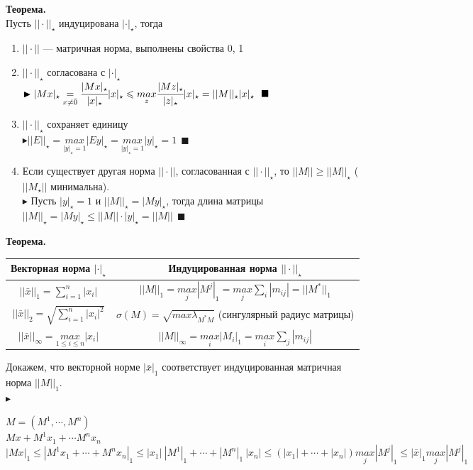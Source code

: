 \documentclass[12pt]{article}
\theoremstyle{definition}
\numberwithin{equation}{section}
\begin{document}
	\textbf{Теорема.}\\
	Пусть $||\cdot ||_{\star}$ индуцирована $|\cdot |_{\star}$, тогда \begin{enumerate}
		\item $||\cdot ||$ --- матричная норма, выполнены свойства 0, 1
		\item $||\cdot ||_{\star}$ согласована с $|\cdot |_{\star}$\\
		$\blacktriangleright |Mx|_{\star}\underset{x\neq \bar 0}{=}\cfrac{|Mx|_{\star}}{|x|_{\star}}|x|_{\star} \leqslant \underset{z}{max}\cfrac{|Mz|_{\star}}{|z|_{\star}}|x|_{\star}=||M||_{\star}|x|_{\star}~~\blacksquare$
		\item $||\cdot ||_{\star}$ сохраняет единицу\\
		$\blacktriangleright ||E||_{\star}=\underset{|y|_{\star}=1}{max}|Ey|_{\star}=\underset{|y|_{\star}=1}{max}|y|_{\star}=1~~\blacksquare$ 
		\item Если существует другая норма $||\cdot ||$, согласованная с $||\cdot||_{\star}$, то $||M|| \geqslant ||M||_{\star}$ ($||M_{\star}||$ минимальна).\\
		$\blacktriangleright$ Пусть $|y|_{\star}=1$ и $||M||_{\star}=|My|_{\star}$, тогда длина матрицы $||M||_{\star}=|My|_{\star} \leqslant ||M||\cdot |y|_{\star}=||M||~~\blacksquare$
	\end{enumerate}
	\textbf{Теорема.}
	\begin{center}
		\begin{tabular}{ | c || c |}
			\hline
			Векторная норма $|\cdot|_{\star}$ & Индуцированная норма $||\cdot||_{\star}$\\ \hline \hline
			$||\bar x||_1 = \sum\limits_{i=1}^n |x_i|$ & $||M||_1 = \underset{j}{max}|M^j|_1=\underset{j}{max}\sum\limits_i|m_{ij}|=||M^*||_1$  \\ \hline \hline
			$||\bar x||_2  = \sqrt{\sum\limits_{i=1}^n |x_i|^2}$ & $\sigma(M)=\sqrt{max \lambda_{M^*M}}$ (сингулярный радиус матрицы) \\
			\hline \hline
			$||\bar x||_\infty = \underset{1\leq i \leq n}{max} |x_i|$ & $||M||_{\infty} = \underset{i}{max}|M_i|_1=\underset{i}{max}\sum\limits_j|m_{ij}|$ \\ \hline
		\end{tabular}
	\end{center}
	Докажем, что векторной норме $|\bar x|_1$ соответствует индуцированная матричная норма $||M||_1$.\\
	$\blacktriangleright$ \begin{center} $M=(M^1,\cdots, M^n)$\\
		$Mx+M^1x_1+\cdots M^nx_n$\\
		$|Mx|_1\leqslant |M^1x_1+\cdots+M^nx_n|_1\leqslant|x_1|~|M^1|_1+\cdots+|M^n|_1~|x_n|\leqslant(|x_1|+\cdots+|x_n|)\underset{j}{max}|M^j|_1\leqslant|\bar x|_1\underset{j}{max}|M^j|_1$\end{center}
\end{document}
